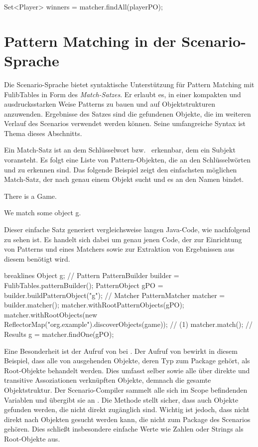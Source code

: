 \begin{jcodeblock}
    Set<Player> winners = matcher.findAll(playerPO);
\end{jcodeblock}

\section{Pattern Matching in der Scenario-Sprache}\label{sec:scenario-pattern-matching}

Die Scenario-Sprache bietet syntaktische Unterstützung für Pattern Matching mit FulibTables in Form des \emph{Match-Satzes}.
Er erlaubt es, in einer kompakten und ausdrucksstarken Weise Patterns zu bauen und auf Objektstrukturen anzuwenden.
Ergebnisse des Satzes sind die gefundenen Objekte, die im weiteren Verlauf des Scenarios verwendet werden können.
Seine umfangreiche Syntax ist Thema dieses Abschnitts.

Ein Match-Satz ist an dem Schlüsselwort  bzw.\  erkennbar, dem ein Subjekt voransteht.
Es folgt eine Liste von Pattern-Objekten, die an den Schlüsselwörten  und  zu erkennen sind.
Das folgende Beispiel zeigt den einfachsten möglichen Match-Satz, der nach genau einem Objekt sucht und es an den Namen  bindet.

\begin{mdcodeblock}
    There is a Game.

    We match some object g.
\end{mdcodeblock}

Dieser einfache Satz generiert vergleichsweise langen Java-Code, wie nachfolgend zu sehen ist.
Es handelt sich dabei um genau jenen Code, der zur Einrichtung von Patterns und eines Matchers sowie zur Extraktion von Ergebnissen aus diesem benötigt wird.

\begin{jcodeblock*}{breaklines}
    Object g;
    {
        // Pattern
        PatternBuilder builder = FulibTables.patternBuilder();
        PatternObject gPO = builder.buildPatternObject("g");
        // Matcher
        PatternMatcher matcher = builder.matcher();
        matcher.withRootPatternObjects(gPO);
        matcher.withRootObjects(new ReflectorMap("org.example").discoverObjects(game)); // (1)
        matcher.match();
        // Results
        g = matcher.findOne(gPO);
    }
\end{jcodeblock*}

Eine Besonderheit ist der Aufruf von  bei .
Der Aufruf von  bewirkt in diesem Beispiel, dass alle von  ausgehenden Objekte, deren Typ zum Package  gehört, als Root-Objekte behandelt werden.
Dies umfasst  selber sowie alle über direkte und transitive Assoziationen verknüpften Objekte, demnach die gesamte Objektstruktur.
Der Scenario-Compiler sammelt alle sich im Scope befindenden Variablen und übergibt sie an .
Die Methode stellt sicher, dass auch Objekte gefunden werden, die nicht direkt zugänglich sind.
Wichtig ist jedoch, dass nicht direkt nach Objekten gesucht werden kann, die nicht zum Package des Scenarios gehören.
Dies schließt insbesondere einfache Werte wie Zahlen oder Strings als Root-Objekte aus.

